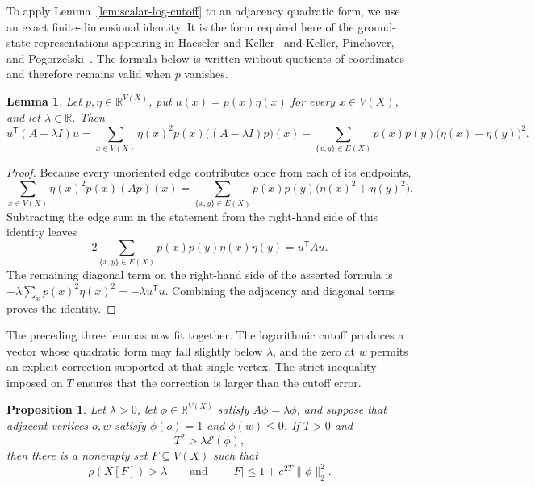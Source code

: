 \documentclass[11pt]{article}
\newtheorem{proposition}[theorem]{Proposition}
\newtheorem{lemma}[theorem]{Lemma}
\theoremstyle{definition}
\theoremstyle{remark}
\begin{document}
To apply Lemma~\ref{lem:scalar-log-cutoff} to an adjacency quadratic form, we use an exact finite-dimensional identity. It is the form required here of the ground-state representations appearing in Haeseler and Keller~\cite[Proposition~3.2]{HaeselerKeller2011Generalized} and Keller, Pinchover, and Pogorzelski~\cite[Proposition~4.8]{KellerPinchoverPogorzelski2020Criticality}. The formula below is written without quotients of coordinates and therefore remains valid when $p$ vanishes.

\begin{lemma}\label{lem:finite-ground-state}
Let $p,\eta\in\mathbb R^{V(X)}$, put $u(x)=p(x)\eta(x)$ for every $x\in V(X)$, and let $\lambda\in\mathbb R$. Then
\[
u^{\mathsf T}(A-\lambda I)u
=\sum_{x\in V(X)}\eta(x)^2p(x)\bigl((A-\lambda I)p\bigr)(x)
-\sum_{\{x,y\}\in E(X)}p(x)p(y)\bigl(\eta(x)-\eta(y)\bigr)^2.
\]
\end{lemma}

\begin{proof}
Because every unoriented edge contributes once from each of its endpoints,
\[
\sum_{x\in V(X)}\eta(x)^2p(x)(Ap)(x)=\sum_{\{x,y\}\in E(X)}p(x)p(y)\bigl(\eta(x)^2+\eta(y)^2\bigr).
\]
Subtracting the edge sum in the statement from the right-hand side of this identity leaves
\[
2\sum_{\{x,y\}\in E(X)}p(x)p(y)\eta(x)\eta(y)=u^{\mathsf T}Au.
\]
The remaining diagonal term on the right-hand side of the asserted formula is $-\lambda\sum_xp(x)^2\eta(x)^2=-\lambda u^{\mathsf T}u$. Combining the adjacency and diagonal terms proves the identity.
\end{proof}

The preceding three lemmas now fit together. The logarithmic cutoff produces a vector whose quadratic form may fall slightly below $\lambda$, and the zero at $w$ permits an explicit correction supported at that single vertex. The strict inequality imposed on $T$ ensures that the correction is larger than the cutoff error.

\begin{proposition}\label{prop:logarithmic-cutoff}
Let $\lambda>0$, let $\phi\in\mathbb R^{V(X)}$ satisfy $A\phi=\lambda\phi$, and suppose that adjacent vertices $o,w$ satisfy $\phi(o)=1$ and $\phi(w)\leq0$. If $T>0$ and
\[
T^2>\lambda\mathcal E(\phi),
\]
then there is a nonempty set $F\subseteq V(X)$ such that
\[
\rho(X[F])>\lambda
\qquad\text{and}\qquad
|F|\leq1+e^{2T}\|\phi\|_2^2.
\]
\end{proposition}
\end{document}
